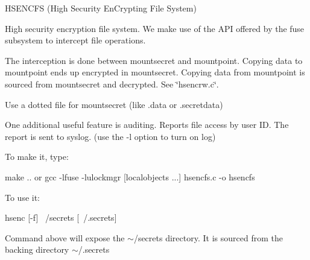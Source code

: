 HSENCFS (High Security En\+Crypting File System)

High security encryption file system. We make use of the API offered by the fuse subsystem to intercept file operations.

The interception is done between mountsecret and mountpoint. Copying data to mountpoint ends up encrypted in mountsecret. Copying data from mountpoint is sourced from mountsecret and decrypted. See \char`\"{}hsencrw.\+c\char`\"{}.

Use a dotted file for mountsecret (like .data or .secretdata)

One additional useful feature is auditing. Reports file access by user ID. The report is sent to syslog. (use the -\/l option to turn on log)

To make it, type\+: \begin{DoxyVerb}make
.. or gcc -lfuse -lulockmgr [localobjects ...] hsencfs.c -o hsencfs
\end{DoxyVerb}
 To use it\+: \begin{DoxyVerb} hsenc [-f] ~/secrets  [~/.secrets]
\end{DoxyVerb}
 Command above will expose the $\sim$/secrets directory. It is sourced from the backing directory $\sim$/.secrets 